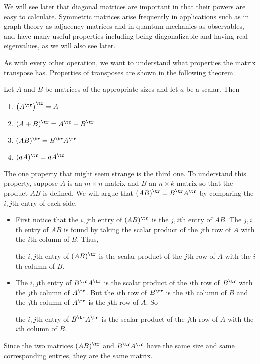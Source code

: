 We will see later that diagonal matrices are important in that their powers are easy to calculate. Symmetric matrices arise frequently in applications such as in graph theory as adjacency matrices and in quantum mechanics as observables, and have many useful properties including being diagonalizable and having real eigenvalues, as we will also see later. 

\label{sec:mtx_transpose_prop}

As with every other operation, we want to understand what properties the matrix transpose has. Properties of transposes are shown in the following theorem.



\begin{theorem} \label{thm:transpose_props} Let $A$ and $B$ be matrices of the appropriate sizes and let $a$ be a scalar. Then
\begin{enumerate}
\item $\left(A^{\tr}\right)^{\tr} = A$
\item $(A+B)^{\tr} = A^{\tr} + B^{\tr}$
\item $(AB)^{\tr} = B^{\tr}A^{\tr}$
\item $(aA)^{\tr} = aA^{\tr}$
\end{enumerate}
\end{theorem}



The one property that might seem strange is the third one. To understand this property, suppose $A$ is an $m \times n$ matrix and $B$ an $n \times k$ matrix so that the product $AB$ is defined. We will argue that $(AB)^{\tr} = B^{\tr}A^{\tr}$ by comparing the $i,j$th entry of each side.
\begin{itemize}
\item First notice that the $i,j$th entry of $(AB)^{\tr}$ is the $j,i$th entry of $AB$. The $j,i$th entry of $AB$ is found by taking the scalar product of the $j$th row of $A$ with the $i$th column of $B$. Thus,
\begin{center} the $i,j$th entry of $(AB)^{\tr}$ is the scalar product of the $j$th row of $A$ with the $i$th column of $B$. \end{center}
\item The $i,j$th entry of $B^{\tr}A^{\tr}$ is the scalar product of the $i$th row of $B^{\tr}$ with the $j$th column of $A^{\tr}$. But the $i$th row of $B^{\tr}$ is the $i$th column of $B$ and the $j$th column of $A^{\tr}$ is the $j$th row of $A$. So
\begin{center} the $i,j$th entry of $B^{\tr}A^{\tr}$ is the scalar product of the $j$th row of $A$ with the $i$th column of $B$. \end{center}
\end{itemize}
Since the two matrices  $(AB)^{\tr}$ and $B^{\tr}A^{\tr}$ have the same size and same corresponding entries, they are the same matrix.

